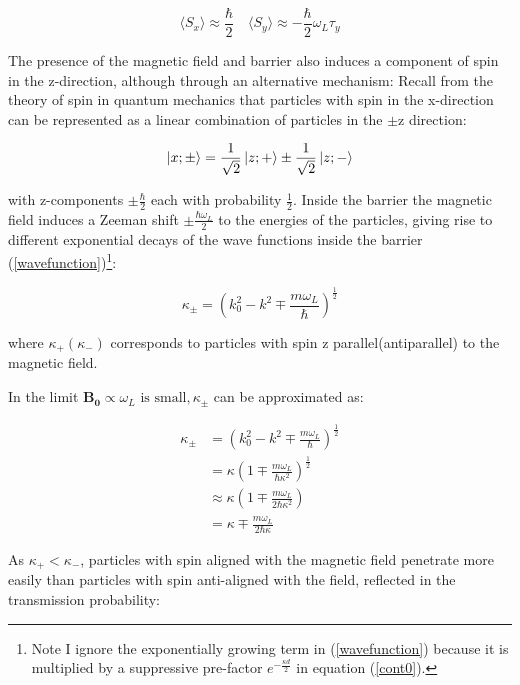 \documentclass{article}
\begin{document}
\begin{equation}
	\langle S_x \rangle \approx \frac{\hbar}{2} \quad \langle S_y \rangle \approx -\frac{\hbar}{2}\omega_L\tau_y
\end{equation}

\noindent The presence of the magnetic field and barrier also induces a component of spin in the z-direction, although through an alternative mechanism: Recall from the theory of spin in quantum mechanics that particles with spin in the x-direction can be represented as a linear combination of particles in the $\pm \text{z}$ direction:

\begin{equation}
	\ket{x; \pm} = \frac{1}{\sqrt{2}}\ket{z;+} \pm \frac{1}{\sqrt{2}}\ket{z;-}
\end{equation}

\noindent with z-components $\pm \frac{\hbar}{2}$ each with probability $\frac{1}{2}$. Inside the barrier the magnetic field induces a Zeeman shift $\pm \frac{\hbar\omega_L}{2}$ to the energies of the particles, giving rise to different exponential decays of the wave functions inside the barrier (\ref{wavefunction})\footnote{Note I ignore the exponentially growing term in (\ref{wavefunction}) because it is multiplied by a suppressive pre-factor $e^{-\frac{\kappa d}{2}}$ in equation (\ref{cont0}).}:

\begin{equation}
	\kappa_{\pm}=(k_0^2-k^2\mp \frac{m\omega_L}{\hbar})^{\frac{1}{2}}
\end{equation}

\noindent where $\kappa_{+}(\kappa_{-})$ corresponds to particles with spin z parallel(antiparallel) to the magnetic field.

\noindent In the limit $\boldsymbol{B_0} \propto \omega_L \text{ is small}, \kappa_{\pm}$ can be approximated as:

\begin{align*}
   \kappa_{\pm} &= \left(k^{2}_{0}-k^{2} \mp \frac{m \omega_{L}}{\hbar}\right)^{\frac{1}{2}}\\	
		&= \kappa \left(1 \mp \frac{m \omega_{L}}{\hbar \kappa^{2}}\right)^{\frac{1}{2}}\\
		&\approx \kappa \left(1 \mp \frac{m \omega_{L}}{2\hbar \kappa^{2}}\right)\\
		&= \kappa \mp \frac{m \omega_{L}}{2\hbar \kappa}
\end{align*}

\noindent As $\kappa_{+} < \kappa_{-}$, particles with spin aligned with the magnetic field penetrate more easily than particles with spin anti-aligned with the field, reflected in the transmission probability:
\end{document}
